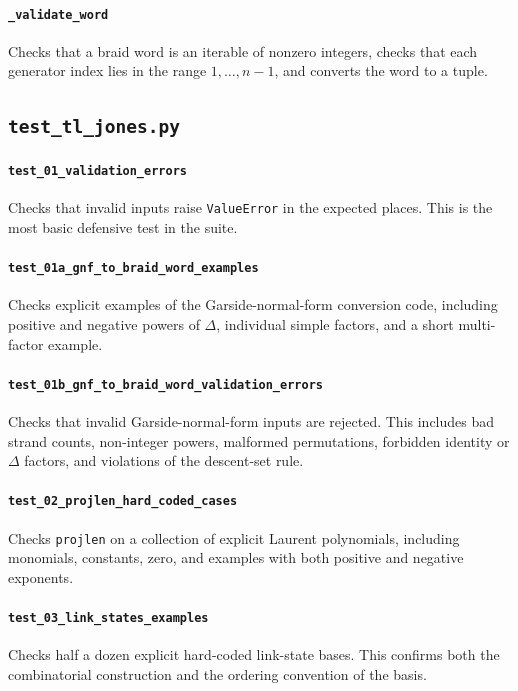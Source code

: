﻿\documentclass[10pt]{article}
\begin{document}
\paragraph{\texttt{\_validate\_word}}
Checks that a braid word is an iterable of nonzero integers, checks that each
generator index lies in the range \(1,\dots,n-1\), and converts the word to a tuple.










\newpage
\subsection{\texttt{test\_tl\_jones.py}}

\paragraph{\texttt{test\_01\_validation\_errors}}
Checks that invalid inputs raise \texttt{ValueError} in the expected places.
This is the most basic defensive test in the suite.

\paragraph{\texttt{test\_01a\_gnf\_to\_braid\_word\_examples}}
Checks explicit examples of the Garside-normal-form conversion code, including positive and negative powers of \(\Delta\), individual simple factors, and a short multi-factor example.

\paragraph{\texttt{test\_01b\_gnf\_to\_braid\_word\_validation\_errors}}
Checks that invalid Garside-normal-form inputs are rejected.
This includes bad strand counts, non-integer powers, malformed permutations, forbidden identity or \(\Delta\) factors, and violations of the descent-set rule.

\paragraph{\texttt{test\_02\_projlen\_hard\_coded\_cases}}
Checks \texttt{projlen} on a collection of explicit Laurent polynomials, including monomials, constants, zero, and examples with both positive and negative exponents.

\paragraph{\texttt{test\_03\_link\_states\_examples}}
Checks half a dozen explicit hard-coded link-state bases.
This confirms both the combinatorial construction and the ordering convention of the basis.
\end{document}
